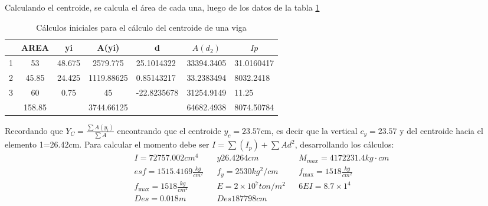 Calculando el centroide, se calcula el área de cada una, luego de los datos de la tabla \ref{tabmm10}
\begin{table}[h!]
    \centering
    \begin{tabular}{@{}lccclll@{}}
    \toprule
                         & AREA   & yi     & A(yi)      & \multicolumn{1}{c}{d} & \multicolumn{1}{c}{$A(d_2)$}   & \multicolumn{1}{c}{$Ip$} \\ \midrule
    1                    & 53     & 48.675 & 2579.775   & 25.1014322            & 33394.3405                     & 31.0160417               \\
    2                    & 45.85  & 24.425 & 1119.88625 & 0.85143217            & 33.2383494                     & 8032.2418                \\
    3                    & 60     & 0.75   & 45         & -22.8235678           & 31254.9149                     & 11.25                    \\
    \multicolumn{1}{c}{} & 158.85 &        & 3744.66125 & \multicolumn{1}{c}{}  & \multicolumn{1}{c}{64682.4938} & 8074.50784               \\ \bottomrule
    \end{tabular}
    \caption{Cálculos iniciales para el cálculo del centroide de una viga}
    \label{tabmm10}
\end{table}
Recordando que $Y_C=\frac{\sum A(y_i)}{\sum A}$ encontrando que el centroide $y_c=23.57$cm, es decir que la vertical $c_y=23.57$ y del centroide hacia el elemento 1=26.42cm.
Para calcular el momento debe ser $I=\sum\left(I_p\right)+\sum Ad^2$, desarrollando los cálculos:
\begin{align*}
    &I =72757.002cm^4&&y 26.4264cm&&M_{max} =4172231.4kg\cdot cm\\
    &esf=1515.4169\frac{kg}{cm^2}&&f_y=2530kg^2/cm&&f_{\max}= 1518 \frac{kg}{cm^2}\\
    &f_{\max} =1518 \frac{kg}{cm^2}&&E = 2 \times 10^7 ton/m^2&&6EI = 8.7 \times 1^{4}\\
    &Des= 0.018m&&Des 187798cm&&
\end{align*}


